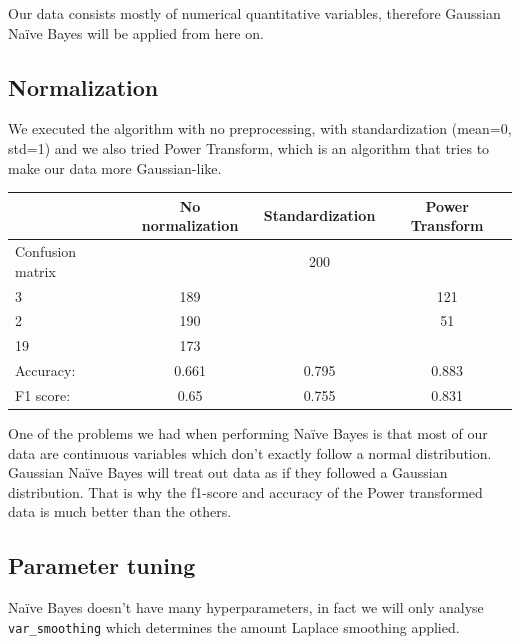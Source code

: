 Our data consists mostly of numerical quantitative variables, therefore Gaussian Na\"ive Bayes will be applied from here on.

\subsection{Normalization}

We executed the algorithm with no preprocessing, with standardization (mean=0, std=1) and we also tried Power Transform, which is an algorithm that tries to make our data more Gaussian-like.

\begin{table}[H]
\centering
\begin{tabular}{lccc}
\toprule
    & No normalization & Standardization & Power Transform \\
    \midrule
    Confusion matrix & 
    \( \begin{bmatrix} 208 & 200 \\ 3 & 189 \end{bmatrix} \) & 
    \( \begin{bmatrix} 287 & 121 \\ 2 & 190\end{bmatrix} \) &
    \( \begin{bmatrix} 357 & 51 \\ 19 & 173\end{bmatrix} \)
    \\
    \addlinespace[0.5em]
    Accuracy: & 0.661 & 0.795 & 0.883 \\
    F1 score: & 0.65 & 0.755 & 0.831 \\
    \bottomrule
\end{tabular}
\end{table}


One of the problems we had when performing Na\"ive Bayes is that most of our data are continuous variables
which don't exactly follow a normal distribution. Gaussian Na\"ive Bayes will treat out data as if they followed 
a Gaussian distribution. That is why the f1-score and accuracy of the Power transformed data is much better than the 
others.

\subsection{Parameter tuning}

Na\"ive Bayes doesn't have many hyperparameters, in fact we will only analyse \texttt{var\_smoothing} which determines the amount Laplace smoothing applied.

